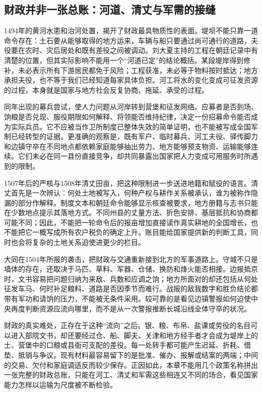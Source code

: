 \subsection{财政并非一张总账：河道、清丈与军需的接缝}

1494年的黄河水患和治河处置，揭开了财政最具物质性的表面。堤坝不能只靠一道命令存在：土石要从能够取得的地方运来，车辆与船只要通过尚可通行的道路，夫役要在农时、灾后居处和既有差役之间被调动。刘大夏主持的工程在朝廷记录中有清楚的位置，但其实际影响不能用一个“河道已定”的结论概括。某段堤岸得到修补，未必表示所有下游居民都免于风险；工程获准，未必等于物料按时抵达；地方承担夫役，也不等于我们已经知道每家具体负担。河工将水的变化变成可征发资源的过程，本身就是国家与地方社会反复协商、拖延、承受的过程。

同年出现的募兵尝试，使人力问题从河岸转到营堡和征发网络。应募者是否到场、饷粮是否兑现、服役期限如何解释、将领能否维持纪律，决定一份招募命令能否成为实际兵员。它不应被当作卫所制度已整体失效的简单证明，也不能被写成全国军制已经转型的证据。更准确的观察是，既有军户、临时募兵、河工夫役、驿传脚力和边镇守卒在不同地点都依赖家庭能够抽出劳力、地方能够预支物资、运输能够连续。它们未必在同一县份直接竞争，却共同暴露出国家把人力变成可用服务时所遇到的限制。

1507年后的严核与1508年清丈田亩，把这种限制进一步送进地籍和赋役的语言。清丈首先是一次辨认：何处土地被写入，何种产权与耕作关系被承认，谁为被称作隐漏的部分作解释。制度文本和朝廷命令能够显示核查被要求，地方册籍与志书只能在少数地点提示其落地方式。不同州县的丈量方法、折色安排、基层抵抗和协商都可能不同；因此，不能把一轮命令后的报亩增加直接读作真实耕地的全国增长，也不能把它一概写成所有农户税负的确定上升。账目能给国家提供新的判断工具，同时也会将复杂的土地关系迫使进更少的栏目。

大同在1504年所报的袭击，把财政与交通重新接到北方的军事道路上。守城不只是墙体的存在，还取决于马匹、草料、军器、仓储、换防和烽火能否相接。边报抵京时，文书容易把问题归纳为来敌、兵数和应调之饷；地方所面对的却还包括从何处征发车马、何时补足粮料、道路是否因季节而难行。战报的敌我数字和胜负结论都带有军功和请饷的压力，不能被无条件采用。较可靠的是看见边镇警报如何迫使中央再度判断资源应流向哪里，而不是从一次警报推断长城沿线全体守卒的状况。

财政的真实难处，正存在于这种“流向”之后。银、粮、布帛、盐课或劳役的名目可以进入部院文书，却还要经过仓、船、脚夫、关津和地方经手者才会成为堤岸上的土、营堡中的口粮或县衙可支配的差役。每一处转手都可能产生迟延、折耗、借垫、抵销与争议。现有材料最容易留下的是批准、催办、报解或结案的两端；中间的交易、欠付和家庭调适反而较少保存。正因如此，本章不能用几个政策名称拼出一张完整的财政总账，只能在河工、清丈和军需这些相连又不同的场合，看见国家能力怎样以运输为尺度被不断检验。

